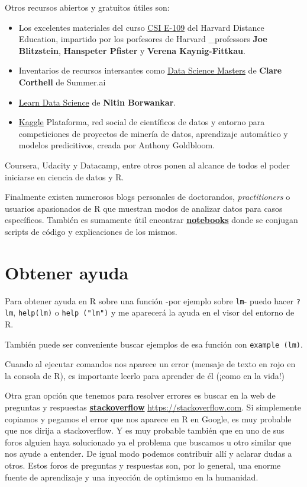 \documentclass[]{book}
\theoremstyle{definition}
\theoremstyle{definition}
\theoremstyle{remark}
\begin{document}
Otros recursos abiertos y gratuitos útiles son:

\begin{itemize}
\item
  Los excelentes materiales del curso
  \href{http://cm.dce.harvard.edu/2014/01/14328/publicationListing.shtml}{CSI
  E-109} del Harvard Distance Education, impartido por los porfesores de
  Harvard \_professors \textbf{Joe Blitzstein}, \textbf{Hanspeter
  Pfister} y \textbf{Verena Kaynig-Fittkau}.
\item
  Inventarios de recursos intersantes como
  \href{http://datasciencemasters.org}{Data Science Masters} de
  \textbf{Clare Corthell} de Summer.ai
\item
  \href{http://learnds.com/}{Learn Data Science} de \textbf{Nitin
  Borwankar}.
\item
  \href{https://www.kaggle.com}{Kaggle} Plataforma, red social de
  científicos de datos y entorno para competiciones de proyectos de
  minería de datos, aprendizaje automático y modelos predicitivos,
  creada por Anthony Goldbloom.
\end{itemize}

Coursera, Udacity y Datacamp, entre otros ponen al alcance de todos el
poder iniciarse en ciencia de datos y R.

Finalmente existen numerosos blogs personales de doctorandos,
\emph{practitioners} o usuarios apasionados de R que muestran modos de
analizar datos para casos específicos. También es sumamente útil
encontrar
\href{http://rmarkdown.rstudio.com/r_notebooks.html}{\textbf{notebooks}}
donde se conjugan scripts de código y explicaciones de los mismos.

\section{Obtener ayuda}\label{obtener-ayuda}

Para obtener ayuda en R sobre una función -por ejemplo sobre
\texttt{lm}- puedo hacer \texttt{?lm}, \texttt{help(lm)} o
\texttt{help\ ("lm")} y me aparecerá la ayuda en el visor del entorno de
R.

También puede ser conveniente buscar ejemplos de esa función con
\texttt{example\ (lm)}.

Cuando al ejecutar comandos nos aparece un error (mensaje de texto en
rojo en la consola de R), es importante leerlo para aprender de él
(¡como en la vida!)

Otra gran opción que tenemos para resolver errores es buscar en la web
de preguntas y respuestas
\href{https://stackoverflow.com}{\textbf{stackoverflow}}
\url{https://stackoverflow.com}. Si simplemente copiamos y pegamos el
error que nos aparece en R en Google, es muy probable que nos dirija a
stackoverflow. Y es muy probable también que en uno de sus foros alguien
haya solucionado ya el problema que buscamos u otro similar que nos
ayude a entender. De igual modo podemos contribuir allí y aclarar dudas
a otros. Estos foros de preguntas y respuestas son, por lo general, una
enorme fuente de aprendizaje y una inyección de optimismo en la
humanidad.
\end{document}
